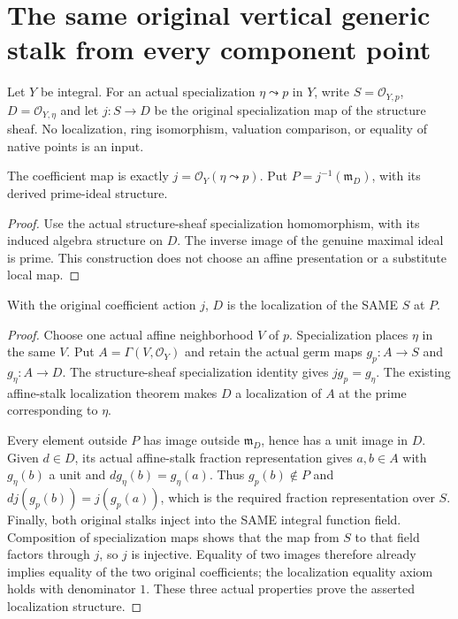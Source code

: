 \section{The same original vertical generic stalk from every component point}

Let $Y$ be integral. For an actual specialization $\eta\leadsto p$ in $Y$,
write $S=\mathcal O_{Y,p}$, $D=\mathcal O_{Y,\eta}$ and let
$j:S\longrightarrow D$ be the original specialization map of the structure
sheaf. No localization, ring isomorphism, valuation comparison, or equality
of native points is an input.

\begin{definition}
\label{def:gauss-common-original-generization-map}
\leanok
The coefficient map is exactly $j=\mathcal O_Y(\eta\leadsto p)$.
Put $P=j^{-1}(\mathfrak m_D)$, with its derived prime-ideal structure.
\end{definition}
\begin{proof}
Use the actual structure-sheaf specialization homomorphism, with its
induced algebra structure on $D$. The inverse image of the genuine maximal
ideal is prime. This construction does not choose an affine presentation
or a substitute local map.
\end{proof}

\begin{lemma}
\label{lem:gauss-common-original-generization-localization}
\leanok
With the original coefficient action $j$, $D$ is the localization of the
SAME $S$ at $P$.
\end{lemma}
\begin{proof}
Choose one actual affine neighborhood $V$ of $p$. Specialization places
$\eta$ in the same $V$. Put $A=\Gamma(V,\mathcal O_Y)$ and retain the
actual germ maps $g_p:A\to S$ and $g_\eta:A\to D$.
The structure-sheaf specialization identity gives
$j g_p=g_\eta$. The existing affine-stalk localization theorem makes
$D$ a localization of $A$ at the prime corresponding to $\eta$.

Every element outside $P$ has image outside $\mathfrak m_D$, hence has a
unit image in $D$. Given $d\in D$, its actual affine-stalk fraction
representation gives $a,b\in A$ with $g_\eta(b)$ a unit and
$d g_\eta(b)=g_\eta(a)$. Thus $g_p(b)\notin P$ and
$d j(g_p(b))=j(g_p(a))$, which is the required fraction representation
over $S$. Finally, both original stalks inject into the SAME integral
function field. Composition of specialization maps shows that the map
from $S$ to that field factors through $j$, so $j$ is injective. Equality
of two images therefore already implies equality of the two original
coefficients; the localization equality axiom holds with denominator $1$.
These three actual properties prove the asserted localization structure.
\end{proof}

